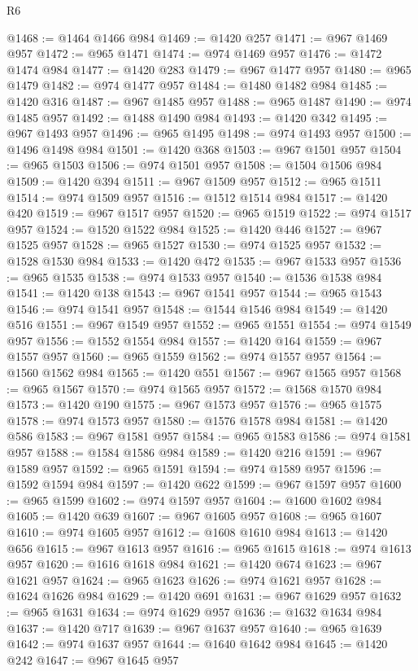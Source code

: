 \begin{lexlean}{R6}
\begin{coremodule}
@1468 := @1464 @1466 @984
@1469 := @1420 @257
@1471 := @967 @1469 @957
@1472 := @965 @1471
@1474 := @974 @1469 @957
@1476 := @1472 @1474 @984
@1477 := @1420 @283
@1479 := @967 @1477 @957
@1480 := @965 @1479
@1482 := @974 @1477 @957
@1484 := @1480 @1482 @984
@1485 := @1420 @316
@1487 := @967 @1485 @957
@1488 := @965 @1487
@1490 := @974 @1485 @957
@1492 := @1488 @1490 @984
@1493 := @1420 @342
@1495 := @967 @1493 @957
@1496 := @965 @1495
@1498 := @974 @1493 @957
@1500 := @1496 @1498 @984
@1501 := @1420 @368
@1503 := @967 @1501 @957
@1504 := @965 @1503
@1506 := @974 @1501 @957
@1508 := @1504 @1506 @984
@1509 := @1420 @394
@1511 := @967 @1509 @957
@1512 := @965 @1511
@1514 := @974 @1509 @957
@1516 := @1512 @1514 @984
@1517 := @1420 @420
@1519 := @967 @1517 @957
@1520 := @965 @1519
@1522 := @974 @1517 @957
@1524 := @1520 @1522 @984
@1525 := @1420 @446
@1527 := @967 @1525 @957
@1528 := @965 @1527
@1530 := @974 @1525 @957
@1532 := @1528 @1530 @984
@1533 := @1420 @472
@1535 := @967 @1533 @957
@1536 := @965 @1535
@1538 := @974 @1533 @957
@1540 := @1536 @1538 @984
@1541 := @1420 @138
@1543 := @967 @1541 @957
@1544 := @965 @1543
@1546 := @974 @1541 @957
@1548 := @1544 @1546 @984
@1549 := @1420 @516
@1551 := @967 @1549 @957
@1552 := @965 @1551
@1554 := @974 @1549 @957
@1556 := @1552 @1554 @984
@1557 := @1420 @164
@1559 := @967 @1557 @957
@1560 := @965 @1559
@1562 := @974 @1557 @957
@1564 := @1560 @1562 @984
@1565 := @1420 @551
@1567 := @967 @1565 @957
@1568 := @965 @1567
@1570 := @974 @1565 @957
@1572 := @1568 @1570 @984
@1573 := @1420 @190
@1575 := @967 @1573 @957
@1576 := @965 @1575
@1578 := @974 @1573 @957
@1580 := @1576 @1578 @984
@1581 := @1420 @586
@1583 := @967 @1581 @957
@1584 := @965 @1583
@1586 := @974 @1581 @957
@1588 := @1584 @1586 @984
@1589 := @1420 @216
@1591 := @967 @1589 @957
@1592 := @965 @1591
@1594 := @974 @1589 @957
@1596 := @1592 @1594 @984
@1597 := @1420 @622
@1599 := @967 @1597 @957
@1600 := @965 @1599
@1602 := @974 @1597 @957
@1604 := @1600 @1602 @984
@1605 := @1420 @639
@1607 := @967 @1605 @957
@1608 := @965 @1607
@1610 := @974 @1605 @957
@1612 := @1608 @1610 @984
@1613 := @1420 @656
@1615 := @967 @1613 @957
@1616 := @965 @1615
@1618 := @974 @1613 @957
@1620 := @1616 @1618 @984
@1621 := @1420 @674
@1623 := @967 @1621 @957
@1624 := @965 @1623
@1626 := @974 @1621 @957
@1628 := @1624 @1626 @984
@1629 := @1420 @691
@1631 := @967 @1629 @957
@1632 := @965 @1631
@1634 := @974 @1629 @957
@1636 := @1632 @1634 @984
@1637 := @1420 @717
@1639 := @967 @1637 @957
@1640 := @965 @1639
@1642 := @974 @1637 @957
@1644 := @1640 @1642 @984
@1645 := @1420 @242
@1647 := @967 @1645 @957

\end{coremodule}
\end{lexlean}
